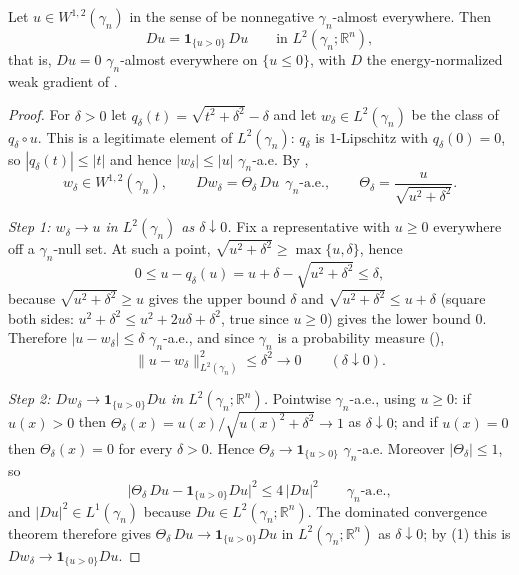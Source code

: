 \begin{lemma}
Let $u \in W^{1,2}(\gamma_n)$ in the sense of  be nonnegative
$\gamma_n$-almost everywhere.  Then
\[
  Du = \mathbf{1}_{\{u>0\}}\, Du
  \qquad\text{in } L^2(\gamma_n;\mathbb{R}^n),
\]
that is, $Du = 0$ $\gamma_n$-almost everywhere on $\{u \leq 0\}$, with $D$ the
energy-normalized weak gradient of .
\end{lemma}
\begin{proof}
For $\delta > 0$ let $q_\delta(t) = \sqrt{t^2+\delta^2}-\delta$ and let
$w_\delta \in L^2(\gamma_n)$ be the class of $q_\delta\circ u$.  This is a
legitimate element of $L^2(\gamma_n)$: $q_\delta$ is $1$-Lipschitz with
$q_\delta(0) = 0$, so $|q_\delta(t)| \leq |t|$ and hence
$|w_\delta| \leq |u|$ $\gamma_n$-a.e.  By ,
\begin{equation*}
  w_\delta \in W^{1,2}(\gamma_n),
  \qquad
  D w_\delta = \Theta_\delta\, Du \ \ \gamma_n\text{-a.e.},
  \qquad
  \Theta_\delta = \frac{u}{\sqrt{u^2+\delta^2}} . \tag{1}
\end{equation*}

\emph{Step 1: $w_\delta \to u$ in $L^2(\gamma_n)$ as $\delta \downarrow 0$.}
Fix a representative with $u \geq 0$ everywhere off a $\gamma_n$-null set.  At
such a point, $\sqrt{u^2+\delta^2} \geq \max\{u, \delta\}$, hence
\[
  0 \leq u - q_\delta(u) = u + \delta - \sqrt{u^2+\delta^2} \leq \delta ,
\]
because $\sqrt{u^2+\delta^2} \geq u$ gives the upper bound $\delta$ and
$\sqrt{u^2+\delta^2} \leq u + \delta$ (square both sides: $u^2+\delta^2 \leq u^2 + 2u\delta + \delta^2$,
true since $u \geq 0$) gives the lower bound $0$.  Therefore
$|u - w_\delta| \leq \delta$ $\gamma_n$-a.e., and since $\gamma_n$ is a
probability measure (),
\[
  \|u - w_\delta\|_{L^2(\gamma_n)}^2 \leq \delta^2 \longrightarrow 0
  \qquad (\delta \downarrow 0).
\]

\emph{Step 2: $Dw_\delta \to \mathbf{1}_{\{u>0\}}Du$ in $L^2(\gamma_n;\mathbb{R}^n)$.}
Pointwise $\gamma_n$-a.e., using $u \geq 0$: if $u(x) > 0$ then
$\Theta_\delta(x) = u(x)/\sqrt{u(x)^2+\delta^2} \to 1$ as $\delta\downarrow0$; and
if $u(x) = 0$ then $\Theta_\delta(x) = 0$ for every $\delta > 0$.  Hence
$\Theta_\delta \to \mathbf{1}_{\{u>0\}}$ $\gamma_n$-a.e.  Moreover
$|\Theta_\delta| \leq 1$, so
\[
  \bigl|\Theta_\delta\, Du - \mathbf{1}_{\{u>0\}}Du\bigr|^2 \leq 4\,|Du|^2
  \qquad\gamma_n\text{-a.e.},
\]
and $|Du|^2 \in L^1(\gamma_n)$ because $Du \in L^2(\gamma_n;\mathbb{R}^n)$.  The
dominated convergence theorem therefore gives
$\Theta_\delta\,Du \to \mathbf{1}_{\{u>0\}}Du$ in $L^2(\gamma_n;\mathbb{R}^n)$ as
$\delta\downarrow0$; by (1) this is $Dw_\delta \to \mathbf{1}_{\{u>0\}}Du$.


\end{proof}
